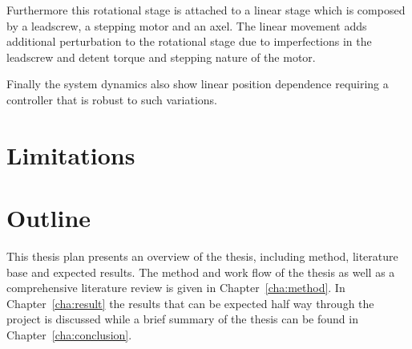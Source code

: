 Furthermore this rotational stage is attached to a linear stage which is composed by a leadscrew, a stepping motor and an axel. The linear movement adds additional perturbation to the rotational stage due to imperfections in the leadscrew and detent torque and stepping nature of the motor.

Finally the system dynamics also show linear position dependence requiring a controller that is robust to such variations.

\section{Limitations}

\section{Outline}
This thesis plan presents an overview of the thesis, including method, literature base and expected results. The method and work flow of the thesis as well as a comprehensive literature review is given in Chapter~\ref{cha:method}. In Chapter~\ref{cha:result} the results that can be expected half way through the project is discussed while a brief summary of the thesis can be found in Chapter~\ref{cha:conclusion}.
